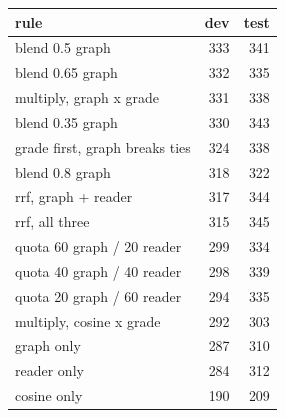 \begin{tabular}{lrr}
\toprule
rule & dev & test \\
\midrule
blend 0.5 graph & 333 & 341 \\
blend 0.65 graph & 332 & 335 \\
multiply, graph x grade & 331 & 338 \\
blend 0.35 graph & 330 & 343 \\
grade first, graph breaks ties & 324 & 338 \\
blend 0.8 graph & 318 & 322 \\
rrf, graph + reader & 317 & 344 \\
rrf, all three & 315 & 345 \\
quota 60 graph / 20 reader & 299 & 334 \\
quota 40 graph / 40 reader & 298 & 339 \\
quota 20 graph / 60 reader & 294 & 335 \\
multiply, cosine x grade & 292 & 303 \\
graph only & 287 & 310 \\
reader only & 284 & 312 \\
cosine only & 190 & 209 \\
\bottomrule
\end{tabular}
